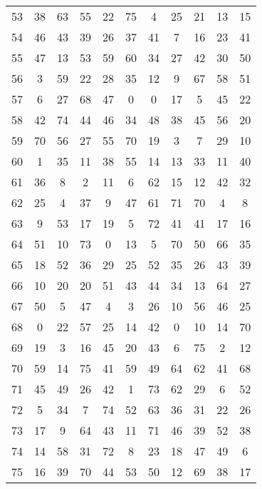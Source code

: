 \begin{table}
\begin{tabular}{c c c c c c c c c c c }
53 & 38 & 63 & 55 & 22 & 75 & 4 & 25 & 21 & 13 & 15 \\
54 & 46 & 43 & 39 & 26 & 37 & 41 & 7 & 16 & 23 & 41 \\
55 & 47 & 13 & 53 & 59 & 60 & 34 & 27 & 42 & 30 & 50 \\
56 & 3 & 59 & 22 & 28 & 35 & 12 & 9 & 67 & 58 & 51 \\
57 & 6 & 27 & 68 & 47 & 0 & 0 & 17 & 5 & 45 & 22 \\
58 & 42 & 74 & 44 & 46 & 34 & 48 & 38 & 45 & 56 & 20 \\
59 & 70 & 56 & 27 & 55 & 70 & 19 & 3 & 7 & 29 & 10 \\
60 & 1 & 35 & 11 & 38 & 55 & 14 & 13 & 33 & 11 & 40 \\
61 & 36 & 8 & 2 & 11 & 6 & 62 & 15 & 12 & 42 & 32 \\
62 & 25 & 4 & 37 & 9 & 47 & 61 & 71 & 70 & 4 & 8 \\
63 & 9 & 53 & 17 & 19 & 5 & 72 & 41 & 41 & 17 & 16 \\
64 & 51 & 10 & 73 & 0 & 13 & 5 & 70 & 50 & 66 & 35 \\
65 & 18 & 52 & 36 & 29 & 25 & 52 & 35 & 26 & 43 & 39 \\
66 & 10 & 20 & 20 & 51 & 43 & 44 & 34 & 13 & 64 & 27 \\
67 & 50 & 5 & 47 & 4 & 3 & 26 & 10 & 56 & 46 & 25 \\
68 & 0 & 22 & 57 & 25 & 14 & 42 & 0 & 10 & 14 & 70 \\
69 & 19 & 3 & 16 & 45 & 20 & 43 & 6 & 75 & 2 & 12 \\
70 & 59 & 14 & 75 & 41 & 59 & 49 & 64 & 62 & 41 & 68 \\
71 & 45 & 49 & 26 & 42 & 1 & 73 & 62 & 29 & 6 & 52 \\
72 & 5 & 34 & 7 & 74 & 52 & 63 & 36 & 31 & 22 & 26 \\
73 & 17 & 9 & 64 & 43 & 11 & 71 & 46 & 39 & 52 & 38 \\
74 & 14 & 58 & 31 & 72 & 8 & 23 & 18 & 47 & 49 & 6 \\
75 & 16 & 39 & 70 & 44 & 53 & 50 & 12 & 69 & 38 & 17 \\
\hline
\end{tabular}
\end{table}